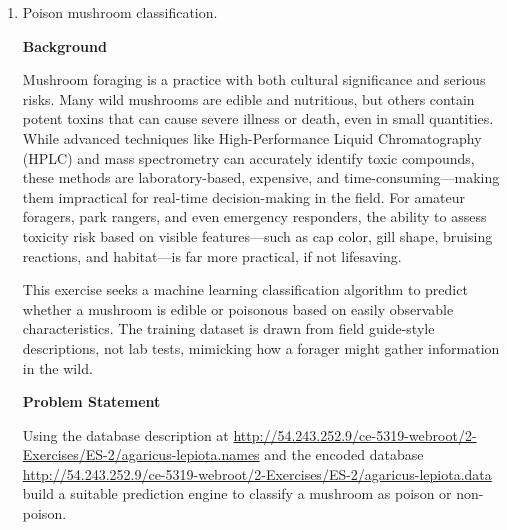 \documentclass[12pt]{article}
\begin{document}
\begin{enumerate}
Next consider some transformations
\begin{itemize}
\item First transformation $\sqrt{Y_{\alpha}} \propto X_{Pu}$
\item Second transformation $\sqrt{Y_{\alpha}} \propto \sqrt{X_{Pu}}$
\end{itemize}

Using your favorite resulting engine (could be one of the above, or another engine you build and fit) render an opinion on whether residue from a smoldering crater indicates that the crater was caused by a fusion device if the instrument measures an alpha activity of 0.0061 counts per second.

\clearpage

\item Poison mushroom classification.

\textbf{Background}

Mushroom foraging is a practice with both cultural significance and serious risks. Many wild mushrooms are edible and nutritious, but others contain potent toxins that can cause severe illness or death, even in small quantities. While advanced techniques like High-Performance Liquid Chromatography (HPLC) and mass spectrometry can accurately identify toxic compounds, these methods are laboratory-based, expensive, and time-consuming—making them impractical for real-time decision-making in the field. For amateur foragers, park rangers, and even emergency responders, the ability to assess toxicity risk based on visible features—such as cap color, gill shape, bruising reactions, and habitat—is far more practical, if not lifesaving.

This exercise seeks a machine learning classification algorithm to predict whether a mushroom is edible or poisonous based on easily observable characteristics. The training dataset is drawn from field guide-style descriptions, not lab tests, mimicking how a forager might gather information in the wild. %

\textbf{Problem Statement}

Using the database description at \url{http://54.243.252.9/ce-5319-webroot/2-Exercises/ES-2/agaricus-lepiota.names} and the encoded database \url{http://54.243.252.9/ce-5319-webroot/2-Exercises/ES-2/agaricus-lepiota.data} build a suitable prediction engine to classify a mushroom as poison or non-poison.  


\end{enumerate}
\end{document}
